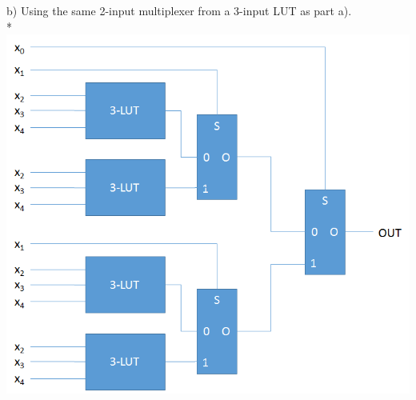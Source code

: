 \documentclass[11pt]{article}
\begin{document}
b) Using the same 2-input multiplexer from a 3-input LUT as part a).\\*
\includegraphics[width=\linewidth]{q1_lut.png}\\\\
\end{document}
